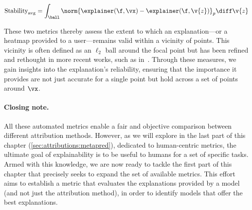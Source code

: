 $$
\text{Stability}_{\text{avg}} = \int_{\ball} \norm{\explainer(\f, \vx) -\explainer(\f, \v{z})}_p \diff \v{z}
$$

These two metrics thereby assess the extent to which an explanation—or a heatmap provided to a user—remains valid within a vicinity of points. This vicinity is often defined as an $\ell_2$ ball around the focal point but has been refined and rethought in more recent works, such as in~\cite{agarwal2022rethinking}. Through these measures, we gain insights into the explanation's reliability, ensuring that the importance it provides are not just accurate for a single point but hold across a set of points around $\vx$.


\paragraph{Closing note.} All these automated metrics enable a fair and objective comparison between different attribution methods. However, as we will explore in the last part of this chapter (\autoref{sec:attributions:metapred}), dedicated to human-centric metrics, the ultimate goal of explainability is to be useful to humans for a set of specific tasks. Armed with this knowledge, we are now ready to tackle the first part of this chapter that precisely seeks to expand the set of available metrics. This effort aims to establish a metric that evaluates the explanations provided by a model (and not just the attribution method), in order to identify models that offer the best explanations.
